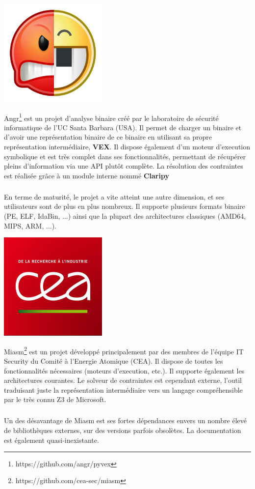 \begin{center}
    \includegraphics[scale=0.3]{angr.png}
\end{center}
Angr\footnote{https://github.com/angr/pyvex} est un projet d'analyse binaire créé par le laboratoire de sécurité informatique de l'UC Santa Barbara (USA).
Il permet de charger un binaire et d'avoir une représentation binaire de ce binaire en utilisant sa propre représentation intermédiaire, \textbf{VEX}.
Il dispose également d'un moteur d'execution symbolique et est très complet dans ses fonctionnalités, permettant de récupérer pleins d'information via
une API plutôt complète. La résolution des contraintes est réalisée grâce à un module interne nommé \textbf{Claripy}
\subparagraph{}
En terme de maturité, le projet a vite atteint une autre dimension, et ses utilisateurs sont de plus en plus nombreux. Il supporte plusieurs formats
binaire (PE, ELF, IdaBin, ...) ainsi que la plupart des architectures classiques (AMD64, MIPS, ARM, ...).

\begin{center}
    \includegraphics[scale=0.3]{cea.png}
\end{center}
Miasm\footnote{https://github.com/cea-sec/miasm} est un projet développé principalement par des membres de l'équipe IT Security du Comité à l'Energie Atomique (CEA).
Il dispose de toutes les fonctionnalités nécessaires (moteurs d'execution, etc.). Il supporte également les architectures courantes. Le solveur de contraintes est
cependant externe, l'outil traduisant juste la représentation intermédiaire vers un langage compréhensible par le très connu Z3 de Microsoft.
\subparagraph{}
Un des désavantage de Miasm est ses fortes dépendances envers un nombre élevé de bibliothèques externes, sur des versions parfois obsolètes. La documentation est également
quasi-inexistante.

